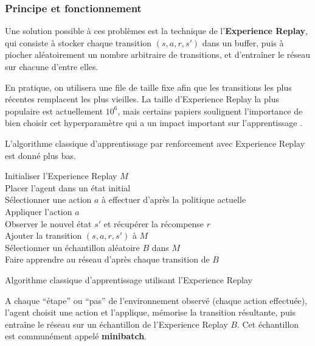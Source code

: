 \subsubsection{Principe et fonctionnement}
\par
Une solution possible à ces problèmes est la technique de l'\textbf{Experience Replay}, qui consiste à stocker chaque transition $(s,a,r,s')$ dans un buffer, puis à piocher aléatoirement un nombre arbitraire de transitions, et d'entraîner le réseau sur chacune d'entre elles.
\par
En pratique, on utilisera une file de taille fixe afin que les transitions les plus récentes remplacent les plus vieilles. La taille d'Experience Replay la plus populaire est actuellement $10^6$, mais certains papiers soulignent l'importance de bien choisir cet hyperparamètre qui a un impact important sur l'apprentissage \cite{exp_replay_deeper}.
\par
L'algorithme classique d'apprentissage par renforcement avec Experience Replay est donné plus bas.

\begin{algorithm}
\SetAlgoLined

Initialiser l'Experience Replay $M$\\
{
Placer l'agent dans un état initial\\
{
Sélectionner une action $a$ à effectuer d'après la politique actuelle \\
Appliquer l'action $a$ \\
Observer le nouvel état $s'$ et récupérer la récompense $r$\\
Ajouter la transition $(s,a,r,s')$ à $M$\\
Sélectionner un échantillon aléatoire $B$ dans $M$\\
Faire apprendre au réseau d'après chaque transition de $B$
}
}

\caption{Algorithme classique d'apprentissage utilisant l'Experience Replay}
\end{algorithm}

A chaque ``étape'' ou ``pas'' de l'environnement observé (chaque action effectuée), l'agent choisit une action et l'applique,  mémorise la transition résultante, puis entraîne le réseau sur un échantillon de l'Experience Replay $B$. Cet échantillon est communément appelé \textbf{minibatch}.


